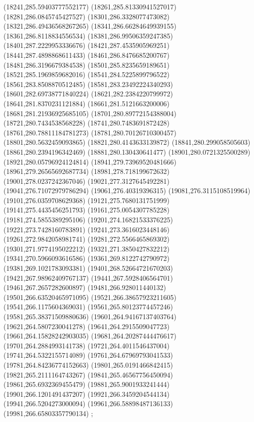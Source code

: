 {(18241,285.59403777552177)
(18261,285.81330941527017)
(18281,286.0845745427527)
(18301,286.3328077473082)
(18321,286.49436568267265)
(18341,286.66284649939155)
(18361,286.8118834556534)
(18381,286.99506359247385)
(18401,287.2229953336676)
(18421,287.4535905969251)
(18441,287.4898868611433)
(18461,286.8476685200767)
(18481,286.3196679384538)
(18501,285.8235659189651)
(18521,285.1969859682016)
(18541,284.5225899796522)
(18561,283.8508870512485)
(18581,283.23492224340293)
(18601,282.69738771840224)
(18621,282.2384220799972)
(18641,281.8370231121884)
(18661,281.5121663200006)
(18681,281.21936925685105)
(18701,280.89772154388004)
(18721,280.7434538568228)
(18741,280.7483691872428)
(18761,280.78811184781273)
(18781,280.70126710300457)
(18801,280.5632459093865)
(18821,280.4143633139872)
(18841,280.299058505603)
(18861,280.2394196342469)
(18881,280.130430641477)
(18901,280.0721325500289)
(18921,280.05796924124814)
(18941,279.73969520481666)
(18961,279.26565692687734)
(18981,278.718199672632)
(19001,278.0237242367046)
(19021,277.3127645492281)
(19041,276.71072979786294)
(19061,276.40319396315)
(19081,276.3115108519964)
(19101,276.0359708629368)
(19121,275.7680131751999)
(19141,275.4435456251793)
(19161,275.0054307785228)
(19181,274.5855389295106)
(19201,274.16821533376225)
(19221,273.7428160783891)
(19241,273.3616023448146)
(19261,272.9842058981741)
(19281,272.5566465869302)
(19301,271.9774195022212)
(19321,271.3850427832212)
(19341,270.5966093616586)
(19361,269.8122742790972)
(19381,269.1021783093381)
(19401,268.52664721670203)
(19421,267.98962409767137)
(19441,267.5928406564701)
(19461,267.2657282600897)
(19481,266.928011440132)
(19501,266.63520465971095)
(19521,266.38657923211605)
(19541,266.1175604369031)
(19561,265.80123774457246)
(19581,265.38371509880636)
(19601,264.94167137403764)
(19621,264.5807230041278)
(19641,264.2915509047723)
(19661,264.15828242903035)
(19681,264.20287444476617)
(19701,264.2884993141738)
(19721,264.4011546437004)
(19741,264.5322155714089)
(19761,264.67969793041533)
(19781,264.84236774152663)
(19801,265.0191466842415)
(19821,265.2111164743267)
(19841,265.46567756450094)
(19861,265.6932369455479)
(19881,265.9001933241444)
(19901,266.1201491437207)
(19921,266.3459204544134)
(19941,266.5204273000094)
(19961,266.58898487136133)
(19981,266.65803357790134)
};

